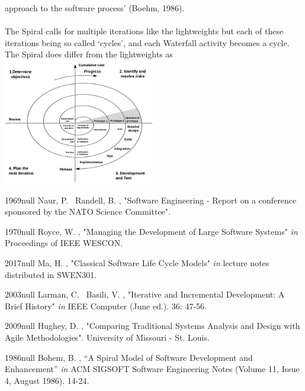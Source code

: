 \documentclass{CRPITStyle}
\begin{document}
		 approach to the software process' (Boehm, 1986).\\
		 ~\\
		The Spiral calls for multiple iterations like the lightweights but each of these iterations being so called `cycles', and each Waterfall
		activity becomes a cycle. The Spiral does differ from the lightweights as \includegraphics{spiral2}

\begin{thebibliography}{xx}

  	{1969}{null}
	Naur, P. \harvardand\ Randell, B.  \harvardyearright , "Software Engineering - Report on a conference sponsored by the NATO Science Committee".
	
	\harvarditem{[Royce]}
	{1970}{null}
	Royce, W. \harvardyearright, "Managing the Development of Large Software Systems" {\em in} Proceedings of IEEE WESCON.

	\harvarditem{[Ma]}
	{2017}{null}
	Ma, H. \harvardyearright, "Classical Software Life Cycle Models" {\em in} lecture notes distributed in SWEN301.
	
	\harvarditem{[Larman]}
	{2003}{null}
	Larman, C. \harvardand\ Basili, V. \harvardyearright, "Iterative and Incremental Development: A Brief History" {\em in} IEEE Computer (June ed.). 36:
	47-56.
	
	\harvarditem{[Hughey]}
	{2009}{null}
	Hughey, D. \harvardyearright, "Comparing Traditional Systems Analysis and Design with Agile Methodologies". University of
	Missouri - St. Louis.
	
	\harvarditem{[Boehm]}
	{1986}{null}
	Bohem, B. \harvardyearright, ``A Spiral Model of Software Development and Enhancement'' {\em in} ACM SIGSOFT Software Engineering
	Notes (Volume 11, Issue 4, August 1986). 14-24.

\end{thebibliography}
		
\end{document}
